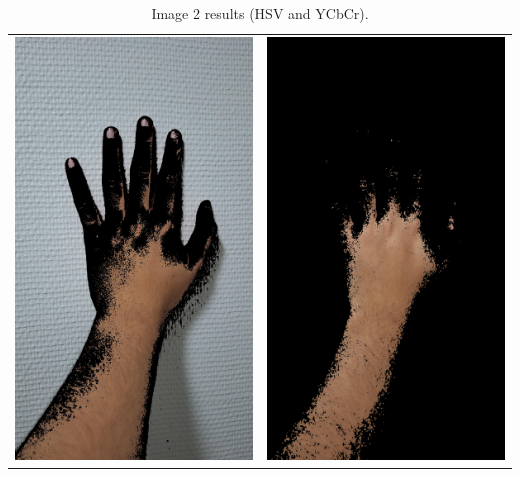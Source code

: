 \documentclass[journal]{IEEEtran}
\begin{document}
\begin{table}[!htbp]
\centering
\begin{tabular}{cc}
    \includegraphics[width=0.3\linewidth]{images/results/hand2_skin_hsv.jpg} & \includegraphics[width=0.3\linewidth]{images/results/hand2_skin_ycc.jpg} \\
\end{tabular}
\caption{Image 2 results (HSV and YCbCr).}
\label{tab:images2}
\end{table}
\end{document}
